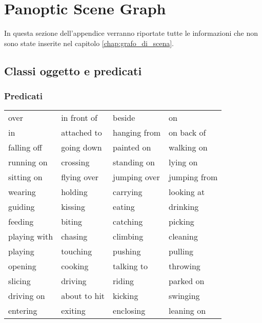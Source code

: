 \chapter{Panoptic Scene Graph}
In questa sezione dell'appendice verranno riportate tutte le informazioni che non sono state inserite nel capitolo \ref{chap:grafo_di_scena}.\\

\section{Classi oggetto e predicati}

\subsection{Predicati}
\begin{center}
  \begin{supertabular}{|l|l|l|l|}
    \hline
    over & in front of & beside & on \\
    in & attached to & hanging from & on back of \\
    falling off & going down & painted on & walking on \\
    running on & crossing & standing on & lying on \\
    sitting on & flying over & jumping over & jumping from \\
    wearing & holding & carrying & looking at \\
    guiding & kissing & eating & drinking \\
    feeding & biting & catching & picking \\
    playing with & chasing & climbing & cleaning \\
    playing & touching & pushing & pulling \\
    opening & cooking & talking to & throwing \\
    slicing & driving & riding & parked on \\
    driving on & about to hit & kicking & swinging \\
    entering & exiting & enclosing & leaning on \\
    \hline
  \end{supertabular}
\end{center}

